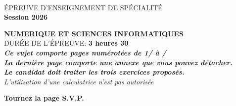 \pagestyle{empty}
\rule{0pt}{1.5cm}
\begin{center}
\\
\vspace{3cm}
{\Large \'EPREUVE D'ENSEIGNEMENT DE SP\'ECIALIT\'E}\\
\vspace{3cm}\Large\bf{Session 2026}\\
\vspace{2cm}

{\LARGE {\bf NUMERIQUE ET SCIENCES INFORMATIQUES}}\\
\vspace{1.5cm}
\vspace{1.5cm}
DUR\'EE DE L'\'EPREUVE: {\bf 3 heures 30} \\
\vspace{2cm}
{\bf {\it Ce sujet comporte \pageref{LastPage} pages numérotées de 1/\pageref{LastPage} à \pageref{LastPage}/\pageref{LastPage}}}\\
{\bf {\it La dernière page comporte une annexe que vous pouvez détacher.}}\\
{\bf {\it Le candidat doit traiter les trois exercices proposés.}}\\
   \vspace{2cm}
{\it L'utilisation d'une calculatrice n'est pas autorisée}\\
\vspace{1.5cm}
\end{center}
\vfill
\hfill {\bf Tournez la page S.V.P.}
